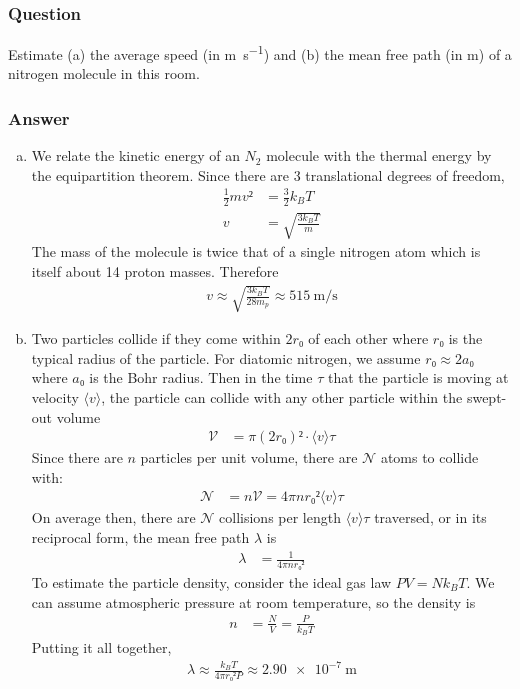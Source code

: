 \subsubsection{Question}

Estimate (a) the average speed (in \si{\m\per\s}) and (b) the mean free path
(in \si{\m}) of a nitrogen molecule in this room.

\subsubsection{Answer}

\begin{enumerate}[(a)]
	\item
		We relate the kinetic energy of an $N_2$ molecule with the thermal
		energy by the equipartition theorem. Since there are 3 translational
		degrees of freedom,
		\begin{align*}
			\frac 12 mv² &= \frac 32 k_B T \\
			v &= \sqrt{\frac{3 k_B T}{m}}
		\end{align*}
		The mass of the molecule is twice that of a single nitrogen atom
		which is itself about 14 proton masses. Therefore
		\begin{align}
			\boxed{
			v ≈ \sqrt{\frac{3 k_B T}{28 m_p}} ≈ \SI{515}{\m\per\s}
			}
		\end{align}
	\item
		Two particles collide if they come within $2r₀$ of each other where
		$r₀$ is the typical radius of the particle. For diatomic nitrogen,
		we assume $r₀ ≈ 2a₀$ where $a₀$ is the Bohr radius. Then in the time
		$τ$ that the particle is moving at velocity $⟨v⟩$, the particle can
		collide with any other particle within the swept-out volume
		\begin{align*}
			\mathcal V &= π(2r₀)² ⋅ ⟨v⟩τ
		\end{align*}
		Since there are $n$ particles per unit volume, there are $\mathcal N$
		atoms to collide with:
		\begin{align*}
			\mathcal N &= n\mathcal V = 4πn{r₀}² ⟨v⟩τ
		\end{align*}
		On average then, there are $\mathcal N$ collisions per length $⟨v⟩τ$
		traversed, or in its reciprocal form, the mean free path $λ$ is
		\begin{align*}
			λ &= \frac{1}{4πn{r₀}²}
		\end{align*}
		To estimate the particle density, consider the ideal gas law
		$PV=Nk_BT$. We can assume atmospheric pressure at room temperature,
		so the density is
		\begin{align*}
			n &= \frac N V = \frac{P}{k_B T}
		\end{align*}
		Putting it all together,
		\begin{align}
			\boxed{
			λ ≈ \frac{k_B T}{4π{r₀}²P} ≈ \SI{2.90e-7}{\m}
			}
		\end{align}
\end{enumerate}
